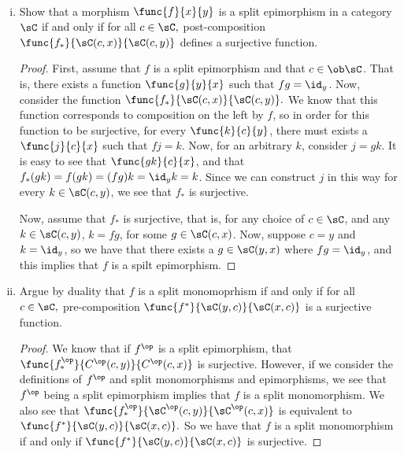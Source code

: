 \documentclass[main.tex]{subfiles}
\begin{document}
\paragraph{}
\begin{exercise}\leavevmode
	\begin{enumerate}[(i)]
	\item Show that a morphism \( \func{f}{x}{y} \) is a split epimorphism
		in a category \( \sC \) if and only if for all \( c\in \sC,\)
		post-composition \( \func{f_*}{\sC(c,x)}{\sC(c,y)} \) defines a
		surjective function.
	\begin{proof}
		 First, assume that \(f\) is a split epimorphism and that \(c \in
		 \ob\sC\). That is, there exists a function \(\func{g}{y}{x}\) such that
		 \(fg = \id_y\). Now, consider the function
		 \(\func{f_*}{\sC(c,x)}{\sC(c,y)}.\) We know that this function
		 corresponds to composition on the left by \(f\), so in order for this
		 function to be surjective, for every \(\func{k}{c}{y}\), there must
		 exists a \(\func{j}{c}{x}\) such that \(fj = k\). Now, for an arbitrary
		 \(k\), consider \(j = gk\). It is easy to see that \(\func{gk}{c}{x}\),
		 and that \(f_*(gk) = f(gk) = (fg)k = \id_yk = k\). Since we can construct
		 \(j\) in this way for every \(k \in \sC(c,y)\), we see that \(f_*\)
		 is surjective.

		Now, assume that \(f_*\) is surjective, that is, for any choice of \(c
		\in \sC\),  and any \(k \in \sC(c,y)\), \(k = fg\), for some \(g \in
		\sC(c,x)\). Now, suppose \(c = y\) and \(k = \id_y\), so we have that
		there exists a \(g \in \sC(y,x)\) where \(fg = \id_y\), and this implies
		that \(f\) is a spilt epimorphism.
	\end{proof}

	\item Argue by duality that \(f\) is a split monomoprhism if and
		only if for all \(c\in\sC,\) pre-composition
		\(\func{f^*}{\sC(y,c)}{\sC(x,c)}\) is a surjective function.
	\begin{proof}
		We know that if \(f^{\op}\) is a split epimorphism, that
		\(\func{f_{*}^{\op}}{C^{\op}(c,y)}{C^{\op}(c,x)}\) is surjective.
		However, if we consider the definitions of \(f^{\op}\) and split
		monomorphisms and epimorphisms, we see that \(f^{\op}\) being a split
		epimorphism implies that \(f\) is a split monomorphism. We also see that
		\(\func{f_{*}^{\op}}{\sC^{\op}(c,y)}{\sC^{\op}(c,x)}\) is equivalent to
		\(\func{f^{*}}{\sC(y,c)}{\sC(x,c)}.\) So we have that \(f\) is a split
		monomorphism if and only if \(\func{f^{*}}{\sC(y,c)}{\sC(x,c)}\) is
		surjective.
	\end{proof}
\end{enumerate}
\end{exercise}
\end{document}
